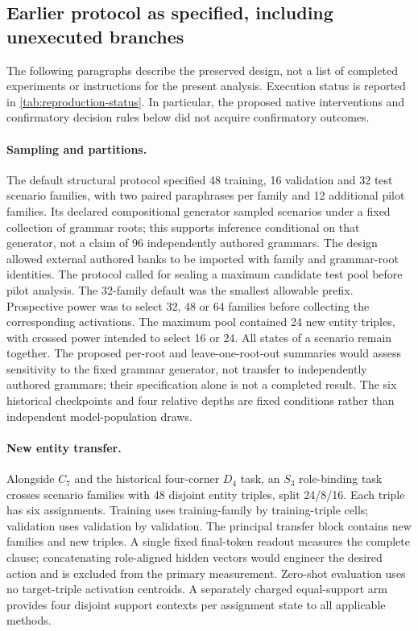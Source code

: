 \subsection{Earlier protocol as specified, including unexecuted branches}
The following paragraphs describe the preserved design, not a list of completed experiments or instructions for the present analysis. Execution status is reported in \cref{tab:reproduction-status}. In particular, the proposed native interventions and confirmatory decision rules below did not acquire confirmatory outcomes.

\paragraph{Sampling and partitions.}
The default structural protocol specified 48 training, 16 validation and 32 test scenario families, with two paired paraphrases per family and 12 additional pilot families. Its declared compositional generator sampled scenarios under a fixed collection of grammar roots; this supports inference conditional on that generator, not a claim of 96 independently authored grammars. The design allowed external authored banks to be imported with family and grammar-root identities. The protocol called for sealing a maximum candidate test pool before pilot analysis. The 32-family default was the smallest allowable prefix. Prospective power was to select 32, 48 or 64 families before collecting the corresponding activations. The maximum pool contained 24 new entity triples, with crossed power intended to select 16 or 24. All states of a scenario remain together. The proposed per-root and leave-one-root-out summaries would assess sensitivity to the fixed grammar generator, not transfer to independently authored grammars; their specification alone is not a completed result. The six historical checkpoints and four relative depths are fixed conditions rather than independent model-population draws.

\paragraph{New entity transfer.}
Alongside $C_7$ and the historical four-corner $D_4$ task, an $S_3$ role-binding task crosses scenario families with 48 disjoint entity triples, split 24/8/16. Each triple has six assignments. Training uses training-family by training-triple cells; validation uses validation by validation. The principal transfer block contains new families and new triples. A single fixed final-token readout measures the complete clause; concatenating role-aligned hidden vectors would engineer the desired action and is excluded from the primary measurement. Zero-shot evaluation uses no target-triple activation centroids. A separately charged equal-support arm provides four disjoint support contexts per assignment state to all applicable methods.

